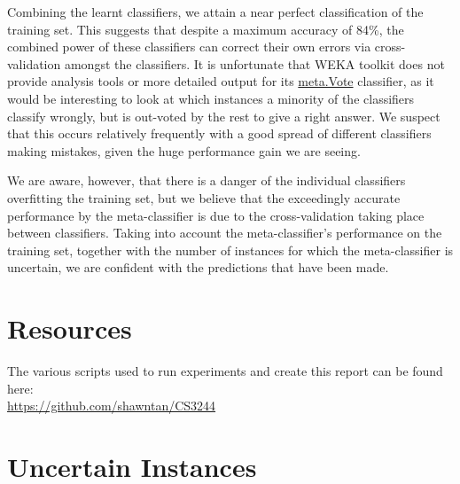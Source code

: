 \documentclass[12pt]{article}
\begin{document}
Combining the learnt classifiers, we attain a near perfect classification of the training set. This suggests that despite a maximum accuracy of 84\%, the combined power of these classifiers can correct their own errors via cross-validation amongst the classifiers. It is unfortunate that WEKA toolkit does not provide analysis tools or more detailed output for its \url{meta.Vote} classifier, as it would be interesting to look at which instances a minority of the classifiers classify wrongly, but is out-voted by the rest to give a right answer. We suspect that this occurs relatively frequently with a good spread of different classifiers making mistakes, given the huge performance gain we are seeing.

We are aware, however, that there is a danger of the individual classifiers overfitting the training set, but we believe that the exceedingly accurate performance by the meta-classifier is due to the cross-validation taking place between classifiers. Taking into account the meta-classifier's performance on the training set, together with the number of instances for which the meta-classifier is uncertain, we are confident with the predictions that have been made.

\appendix
\section{Resources}
The various scripts used to run experiments and create this report can be found here: \\
\url{https://github.com/shawntan/CS3244}
\section{Uncertain Instances}\label{unsure}
\linespread{0.25}

\end{document}
